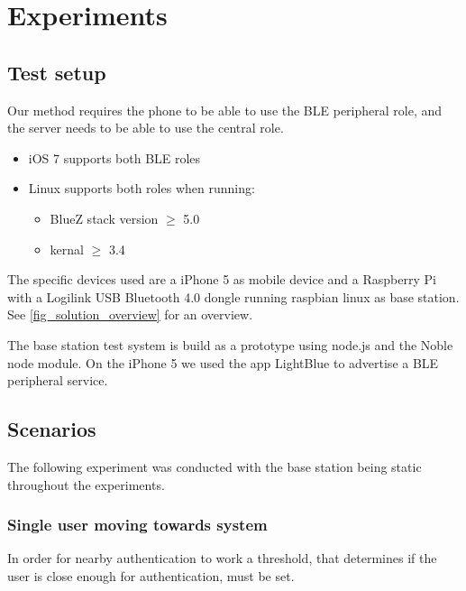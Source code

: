 \section{Experiments}

\subsection{Test setup}

Our method requires the phone to be able to use the BLE peripheral role, and the server needs to be able to use the central role.
\begin{itemize}
	\item iOS 7 supports both BLE roles
	\item Linux supports both roles when running:
	\begin{itemize}
		\item BlueZ stack version $\geq$ 5.0
		\item kernal $\geq$ 3.4 
	\end{itemize}
\end{itemize}
%
The specific devices used are a iPhone 5 as mobile device and a Raspberry Pi with a Logilink USB Bluetooth 4.0 dongle running raspbian linux as base station. See \cref{fig_solution_overview} for an overview.

The base station test system is build as a prototype using node.js and the Noble node module.
On the iPhone 5 we used the app LightBlue to advertise a BLE peripheral service.


\subsection{Scenarios}

The following experiment was conducted with the base station being static throughout the experiments.


\subsubsection{Single user moving towards system}
\label{section:MovingTowardsSystem}
In order for nearby authentication to work a threshold, that determines if the user is close enough for authentication, must be set.

